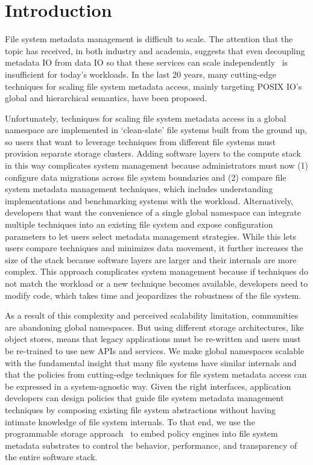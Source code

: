 \chapter{Introduction}

File system metadata management is difficult to scale. The attention that the
topic has received, in both industry and academia, suggests that even
decoupling metadata IO from data IO so that these services can scale
independently~\cite{alam:pdsw2011-metadata-scaling, ghemawat:sosp2003-gfs,
hildebrand:msst2005-pnfs, weil:osdi2006-ceph, welch:fast2008-panasas,
xing:sc2009-skyfs} is insufficient for today's workloads. In the last 20 years,
many cutting-edge techniques for scaling file system metadata access, mainly
targeting POSIX IO's global and hierarchical semantics, have been proposed.

Unfortunately, techniques for scaling file system metadata access in a global namespace are
implemented in `clean-slate' file systems built from the ground up, so users
that want to leverage techniques from different file systems must provision
separate storage clusters. Adding software layers to the compute stack in this
way complicates system management because administrators must now (1) configure
data migrations across file system boundaries and (2) compare file system
metadata management techniques, which includes understanding implementations
and benchmarking systems with the workload.  Alternatively, developers that
want the convenience of a single global namespace can integrate multiple
techniques into an existing file system and expose configuration parameters to
let users select metadata management strategies.  While this lets users compare
techniques and minimizes data movement, it further increases the size of the
stack because software layers are larger and their internals are more complex.
This approach complicates system management because if techniques do not match
the workload or a new technique becomes available, developers need to modify
code, which takes time and jeopardizes the robustness of the file system.

As a result of this complexity and perceived scalability limitation,
communities are abandoning global namespaces. But using different storage
architectures, like object stores, means that legacy applications must be re-written
and users must be re-trained to use new APIs and services. We make global
namespaces scalable with the fundamental insight that
many file systems have similar internals and that the policies from
cutting-edge techniques for file system metadata access can be expressed in a
system-agnostic way.  Given the right interfaces, application developers can
design policies that guide file system metadata management techniques by
composing existing file system abstractions without having intimate
knowledge of file system internals.  To that end, we use the programmable
storage approach~\cite{sevilla:eurosys17-malacology} to embed policy engines
into file system metadata substrates to control the behavior, performance, and
transparency of the entire software stack.

